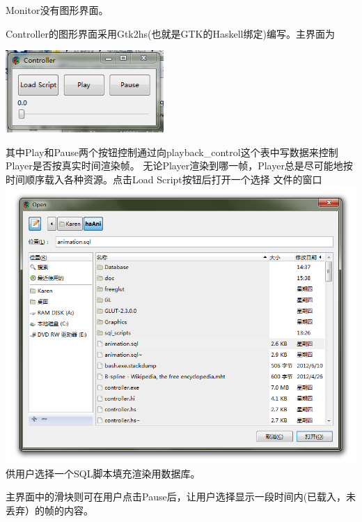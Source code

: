 \documentclass[12pt,a4paper]{article}
\begin{document}
Monitor没有图形界面。

\vspace{20mm}
Controller的图形界面采用Gtk2hs(也就是GTK的Haskell绑定)编写。主界面为

\vspace{5mm}\begin{center}\includegraphics[width=60mm]{p1.png}\end{center}\vspace{10mm}
其中Play和Pause两个按钮控制通过向playback\_control这个表中写数据来控制Player是否按真实时间渲染帧。%
无论Player渲染到哪一帧，Player总是尽可能地按时间顺序载入各种资源。点击Load Script按钮后打开一个选择%
文件的窗口\\
\vspace{5mm}\noindent\includegraphics[width=\textwidth]{p2.png}\vspace{5mm}
供用户选择一个SQL脚本填充渲染用数据库。

主界面中的滑块则可在用户点击Pause后，让用户选择显示一段时间内(已载入，未丢弃）的帧的内容。
\end{document}
